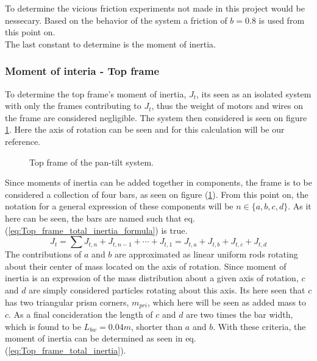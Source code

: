 \documentclass[../../main]{subfiles}
\begin{document}
To determine the vicious friction experiments not made in this project would be nessecary. Based on the behavior of the system a friction of $b = 0.8$ is used from this point on.\\
The last constant to determine is the moment of inertia.

\subsubsection{Moment of interia - Top frame}
\label{ch:Top_frame_inertia}
To determine the top frame's moment of inertia, $J_{t}$, its seen as an isolated system with only the frames contributing to $J_{t}$, thus the weight of motors and wires on the frame are considered negligible. The system then considered is seen on figure \ref{fig:TopFrame}. Here the axis of rotation can be seen and for this calculation will be our reference.\\

\begin{figure}[h]
  \label{fig:TopFrame}
  \centering
  
  \caption{Top frame of the pan-tilt system.}
\end{figure}


Since moments of inertia can be added together in components, the frame is to be considered a collection of four bars, as seen on figure (\ref{fig:TopFrame}). From this point on, the notation for a general expression of these components will be $n \in \{a,b,c,d\}$. As it here can be seen, the bars are named such that eq. (\ref{eq:Top_frame_total_inertia_formula}) is true.
\begin{equation}
  \label{eq:Top_frame_total_inertia_formula}
  J_t = \sum J_{t,n} + J_{t,n-1} + \dotsb + J_{t,1} = J_{t,a} + J_{t,b} + J_{t,c} + J_{t,d}
\end{equation}
The contributions of $a$ and $b$ are approximated as linear uniform rods rotating about their center of mass located on the axis of rotation. Since moment of inertia is an expression of the mass distribution about a given axis of rotation, $c$ and $d$ are simply considered particles  rotating about this axis. Its here seen that $c$ has two triangular prism corners, $m_{pri}$, which here will be seen as added mass to $c$. As a final concideration the length of $c$ and $d$ are two times the bar width, which is found to be $L_{bw} = 0.04m$, shorter than $a$ and $b$. With these criteria, the moment of inertia can be determined as seen in eq. (\ref{eq:Top_frame_total_inertia}).
\end{document}
